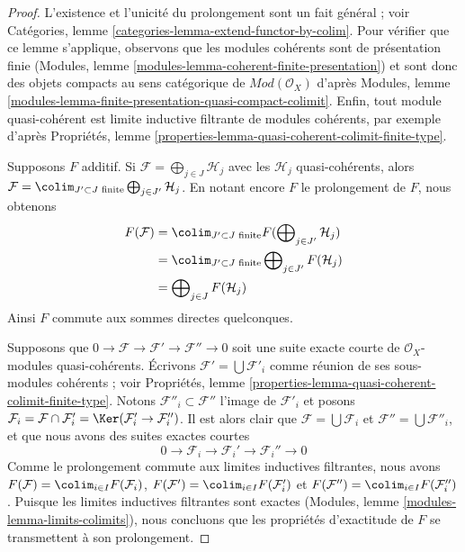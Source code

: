 \begin{proof}
L'existence et l'unicité du prolongement sont un fait général ; voir
Catégories, lemme \ref{categories-lemma-extend-functor-by-colim}.
Pour vérifier que ce lemme s'applique, observons que les modules cohérents
sont de présentation finie (Modules, lemme
\ref{modules-lemma-coherent-finite-presentation}) et sont donc des objets
compacts au sens catégorique de $\textit{Mod}(\mathcal{O}_X)$ d'après
Modules, lemme \ref{modules-lemma-finite-presentation-quasi-compact-colimit}.
Enfin, tout module quasi-cohérent est limite inductive filtrante de modules
cohérents, par exemple d'après Propriétés, lemme
\ref{properties-lemma-quasi-coherent-colimit-finite-type}.

\medskip\noindent
Supposons $F$ additif. Si
$\mathcal{F} = \bigoplus_{j \in J} \mathcal{H}_j$
avec les $\mathcal{H}_j$ quasi-cohérents, alors
$\mathcal{F} = \colim_{J' \subset J\text{ finite}}
\bigoplus_{j \in J'} \mathcal{H}_j$.
En notant encore $F$ le prolongement de $F$, nous obtenons
\begin{align*}
F(\mathcal{F})
& =
\colim_{J' \subset J\text{ finite}}
F(\bigoplus\nolimits_{j \in J'} \mathcal{H}_j) \\
& =
\colim_{J' \subset J\text{ finite}}
\bigoplus\nolimits_{j \in J'} F(\mathcal{H}_j) \\
& =
\bigoplus\nolimits_{j \in J} F(\mathcal{H}_j)
\end{align*}
Ainsi $F$ commute aux sommes directes quelconques.

\medskip\noindent
Supposons que
$0 \to \mathcal{F} \to \mathcal{F}' \to \mathcal{F}'' \to 0$
soit une suite exacte courte de $\mathcal{O}_X$-modules quasi-cohérents.
Écrivons $\mathcal{F}' = \bigcup \mathcal{F}'_i$ comme réunion de ses
sous-modules cohérents ; voir Propriétés, lemme
\ref{properties-lemma-quasi-coherent-colimit-finite-type}.
Notons $\mathcal{F}''_i \subset \mathcal{F}''$ l'image de $\mathcal{F}'_i$
et posons $\mathcal{F}_i = \mathcal{F} \cap \mathcal{F}'_i =
\Ker(\mathcal{F}'_i \to \mathcal{F}''_i)$. Il est alors clair que
$\mathcal{F} = \bigcup \mathcal{F}_i$ et
$\mathcal{F}'' = \bigcup \mathcal{F}''_i$, et que nous avons des suites
exactes courtes
$$
0 \to \mathcal{F}_i \to \mathcal{F}_i' \to \mathcal{F}_i'' \to 0
$$
Comme le prolongement commute aux limites inductives filtrantes, nous avons
$F(\mathcal{F}) = \colim_{i \in I} F(\mathcal{F}_i)$,
$F(\mathcal{F}') = \colim_{i \in I} F(\mathcal{F}'_i)$ et
$F(\mathcal{F}'') = \colim_{i \in I} F(\mathcal{F}''_i)$.
Puisque les limites inductives filtrantes sont exactes
(Modules, lemme \ref{modules-lemma-limits-colimits}), nous concluons que les
propriétés d'exactitude de $F$ se transmettent à son prolongement.
\end{proof}

